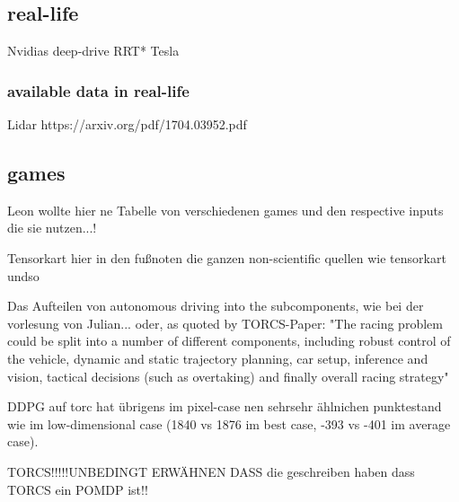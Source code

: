\subsection{real-life}

Nvidias deep-drive
RRT*
Tesla

\subsubsection{available data in real-life}

Lidar
https://arxiv.org/pdf/1704.03952.pdf


\subsection{games}

Leon wollte hier ne Tabelle von verschiedenen games und den respective inputs die sie nutzen...!


\begin{table}
\end{table}

Tensorkart
hier in den fußnoten die ganzen non-scientific quellen wie tensorkart undso

Das Aufteilen von autonomous driving into the subcomponents, wie bei der vorlesung von Julian... oder, as quoted by TORCS-Paper: "The racing problem could be split into a number of different components, including robust control of the vehicle, dynamic and static trajectory planning, car setup, inference and vision, tactical decisions (such as overtaking) and finally overall racing strategy"

DDPG auf torc hat übrigens im pixel-case nen sehrsehr ählnichen punktestand wie im low-dimensional case (1840 vs 1876 im best case, -393 vs -401 im average case).


TORCS!!!!!UNBEDINGT ERWÄHNEN DASS die geschreiben haben dass TORCS ein POMDP ist!!